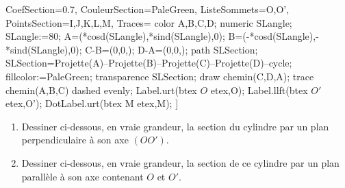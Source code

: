 \begin{exercice*}
\begin{minipage}{0.5\linewidth}
\begin{center}
{                    CoefSection=0.7,
                    CouleurSection=PaleGreen,
                    ListeSommets={O,O'},
                    PointsSection={I,J,K,L,M},
                    Traces={
                        color A,B,C,D;
                        numeric SLangle;
                        SLangle:=80;
                        A=(*cosd(SLangle),*sind(SLangle),0);
                        B=(-*cosd(SLangle),-*sind(SLangle),0);
                        C-B=(0,0,);
                        D-A=(0,0,);                
                        path SLSection;
                        SLSection=Projette(A)--Projette(B)--Projette(C)--Projette(D)--cycle;
                        fillcolor:=PaleGreen;
                        transparence SLSection;%
                        draw chemin(C,D,A);
                        trace chemin(A,B,C) dashed evenly;
                        Label.urt(btex $O$ etex,O);
                        Label.llft(btex $O'$ etex,O');
                        DotLabel.urt(btex M etex,M);                
                    }
                ]%
            }
        \end{center}
    \end{minipage}
    \begin{enumerate}
        \item Dessiner ci-dessous, en vraie grandeur, la section du cylindre par un plan perpendiculaire à son axe $(OO')$.
        \\\vspace*{60mm}
        \item Dessiner ci-dessous, en vraie grandeur, la section de ce cylindre par un plan parallèle à son axe contenant $O$ et $O'$.
        \\\vspace*{60mm}
    \end{enumerate}
\end{exercice*}
